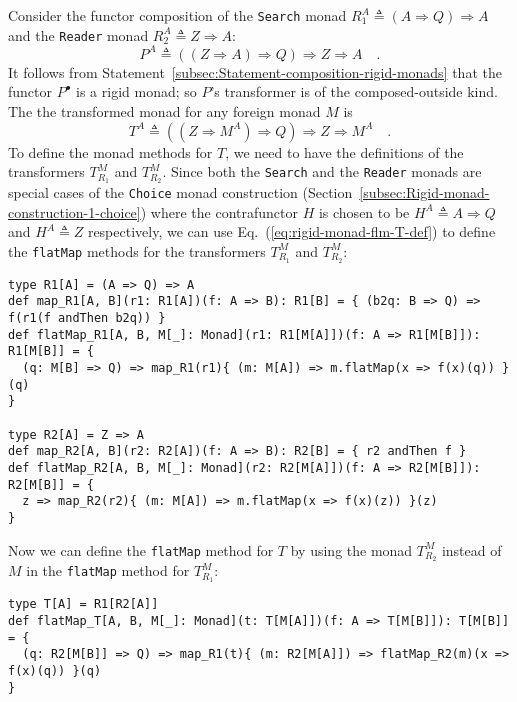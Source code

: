 Consider the functor composition of the \lstinline!Search!
monad $R_{1}^{A}\triangleq\left(A\Rightarrow Q\right)\Rightarrow A$
and the \lstinline!Reader!
monad $R_{2}^{A}\triangleq Z\Rightarrow A$:
\[
P^{A}\triangleq((Z\Rightarrow A)\Rightarrow Q)\Rightarrow Z\Rightarrow A\quad.
\]
It follows from Statement~\ref{subsec:Statement-composition-rigid-monads}
that the functor $P^{\bullet}$ is a rigid monad; so $P$'s transformer
is of the composed-outside kind. The the transformed monad for any
foreign monad $M$ is 
\[
T^{A}\triangleq((Z\Rightarrow M^{A})\Rightarrow Q)\Rightarrow Z\Rightarrow M^{A}\quad.
\]
To define the monad methods for $T$, we need to have the definitions
of the transformers $T_{R_{1}}^{M}$ and $T_{R_{2}}^{M}$. Since both
the \lstinline!Search!
and the \lstinline!Reader!
monads are special cases of the \lstinline!Choice!
monad construction (Section~\ref{subsec:Rigid-monad-construction-1-choice})
where the contrafunctor $H$ is chosen to be $H^{A}\triangleq A\Rightarrow Q$
and $H^{A}\triangleq Z$ respectively, we can use Eq.~(\ref{eq:rigid-monad-flm-T-def})
to define the \lstinline!flatMap!
methods for the transformers $T_{R_{1}}^{M}$ and $T_{R_{2}}^{M}$:
\begin{lstlisting}
type R1[A] = (A => Q) => A
def map_R1[A, B](r1: R1[A])(f: A => B): R1[B] = { (b2q: B => Q) => f(r1(f andThen b2q)) }
def flatMap_R1[A, B, M[_]: Monad](r1: R1[M[A]])(f: A => R1[M[B]]): R1[M[B]] = {
  (q: M[B] => Q) => map_R1(r1){ (m: M[A]) => m.flatMap(x => f(x)(q)) }(q)
}

type R2[A] = Z => A
def map_R2[A, B](r2: R2[A])(f: A => B): R2[B] = { r2 andThen f }
def flatMap_R2[A, B, M[_]: Monad](r2: R2[M[A]])(f: A => R2[M[B]]): R2[M[B]] = {
  z => map_R2(r2){ (m: M[A]) => m.flatMap(x => f(x)(z)) }(z)
}   
\end{lstlisting}
Now we can define the \lstinline!flatMap!
method for $T$ by using the monad $T_{R_{2}}^{M}$ instead of $M$
in the \lstinline!flatMap!
method for $T_{R_{1}}^{M}$:
\begin{lstlisting}
type T[A] = R1[R2[A]]
def flatMap_T[A, B, M[_]: Monad](t: T[M[A]])(f: A => T[M[B]]): T[M[B]] = {
  (q: R2[M[B]] => Q) => map_R1(t){ (m: R2[M[A]]) => flatMap_R2(m)(x => f(x)(q)) }(q)
}
\end{lstlisting}

